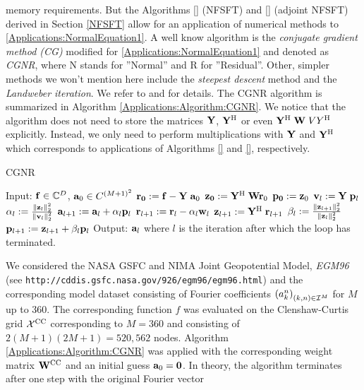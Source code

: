   memory requirements. But the Algorithms \ref{} (NFSFT) and \ref{} (adjoint NFSFT)
  derived in Section \ref{NFSFT} allow for an application of numerical methods to
  \eqref{Applications:NormalEquation1}. A well know algorithm is the 
  \emph{conjugate gradient method (CG)} modified for 
  \eqref{Applications:NormalEquation1} and denoted as \emph{CGNR}, where N stands 
  for ''Normal'' and R for ''Residual''. Other, simpler methods we won't mention here
  include the \emph{steepest descent} method and the \emph{Landweber iteration}. We 
  refer to \cite{bjoerk} and \cite{golo} for details. The CGNR algorithm is summarized in 
  Algorithm \ref{Applications:Algorithm:CGNR}. We notice that the algorithm does not 
  need to store the matrices $\mathbf{Y}$, $\mathbf{Y}^{\text{\rm{H}}}$ or even $\mathbf{Y}^{\text{\rm{H}}} \; \mathbf{W} \; 
  V{Y}^{\text{\rm{H}}}$ explicitly. Instead, we only need to perform multiplications with 
  $\mathbf{Y}$ and $\mathbf{Y}^{\text{\rm{H}}}$ which corresponds to applications of Algorithms 
  \ref{} and \ref{}, respectively.
 
  \begin{algorithm}[tb]
    \caption{CGNR}
    \label{Applications:Algorithm:CGNR}    
	  \begin{algorithmic}
	    \STATE  Input:  $\mathbf{f} \in \mathbb{C}^{D}$, $\mathbf{a}_{0} \in C^{(M+1)^2}$
	    \STATE
	    \STATE $\mathbf{r_{0}} := \mathbf{f} - \mathbf{Y} \; \mathbf{a}_{0}$
	    \STATE $\mathbf{z_{0}} := \mathbf{Y}^{\text{\rm{H}}} \; \mathbf{W} \mathbf{r}_{0}$
	    \STATE $\mathbf{p_{0}} := \mathbf{z}_{0}$
	    \STATE 
	      \STATE $\mathbf{v}_{l} := \mathbf{Y} \; \mathbf{p}_{l}$
	      \STATE $\alpha_{l} := \frac{\left\|\mathbf{z}_{l}\right\|_{2}^2}{\left\|\mathbf{v}_{l}\right\|_{2}^2}$  
	      \STATE $\mathbf{a}_{l+1} := \mathbf{a}_{l} + \alpha_{l} \mathbf{p}_{l}$
	      \STATE $\mathbf{r}_{l+1} := \mathbf{r}_{l} - \alpha_{l} \mathbf{w}_{l}$
	      \STATE $\mathbf{z}_{l+1} := \mathbf{Y}^{\text{\rm{H}}} \; \mathbf{r}_{l+1}$
	      \STATE $\beta_{l}   := \frac{\left\|\mathbf{z}_{l+1}\right\|_{2}^2}{\left\|\mathbf{z}_{l}\right\|_{2}^2}$
	      \STATE $\mathbf{p}_{l+1} := \mathbf{z}_{l+1} + \beta_{l} \mathbf{p}_{l}$
	    \ENDFOR
	    \STATE
	    \STATE Output: $\mathbf{a}_{l}$ where $l$ is the iteration after which the loop has terminated.
	  \end{algorithmic}
  \end{algorithm}
  
  \begin{example}
    We considered the NASA GSFC and NIMA Joint Geopotential Model, \emph{EGM96} (see 
    \verb+http://cddis.gsfc.nasa.gov/926/egm96/egm96.html+) and the corresponding model 
    dataset consisting of Fourier coefficients $\left(a_{k}^n\right)_{(k,n) \in \mathcal{I}^M}$
    for $M$ up to 360.
    The corresponding function $f$ was evaluated on the Clenshaw-Curtis grid 
    $\mathcal{X}^{\mbox{\scriptsize\rm{CC}}}$ corresponding to $M = 360$ and consisting of $2(M+1)(2M+1) = 520,562$
    nodes. Algorithm \ref{Applications:Algorithm:CGNR} was applied with the corresponding 
    weight matrix $\mathbf{W}^{\mbox{\scriptsize\rm{CC}}}$ and an initial guess $\mathbf{a}_{0} = \mathbf{0}$. In theory, the
    algorithm terminates after one step with the original Fourier vector
  \end{example}
  
